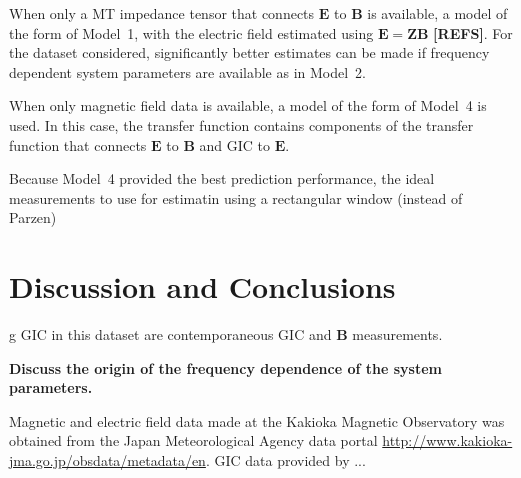 \documentclass[draft,linenumbers]{agujournal2018}
\begin{document}
\begin{itemize}
When only a MT impedance tensor that connects $\mathbf{E}$ to $\mathbf{B}$ is available, a model of the form of Model~1, with the electric field estimated using $\mathbf{E}=\mathbf{Z}\mathbf{B}$  {\color{red} \textbf{[REFS]}}. For the dataset considered, significantly better estimates can be made if frequency dependent system parameters are available as in Model~2.

When only magnetic field data is available, a model of the form of Model~4 is used. In this case, the transfer function contains components of the transfer function that connects $\mathbf{E}$ to $\mathbf{B}$ and GIC to $\mathbf{E}$. 

Because Model~4 provided the best prediction performance, the ideal measurements to use for estimatin using a rectangular window (instead of Parzen)
\end{itemize}

\section{Discussion and Conclusions}
g GIC in this dataset are contemporaneous GIC and $\mathbf{B}$ measurements.

 {\color{red}\textbf{Discuss the origin of the frequency dependence of the system parameters.}}

\acknowledgments
Magnetic and electric field data made at the Kakioka Magnetic Observatory was obtained from the Japan Meteorological Agency data portal \url{http://www.kakioka-jma.go.jp/obsdata/metadata/en}. GIC data provided by ...



\clearpage
\end{document}

